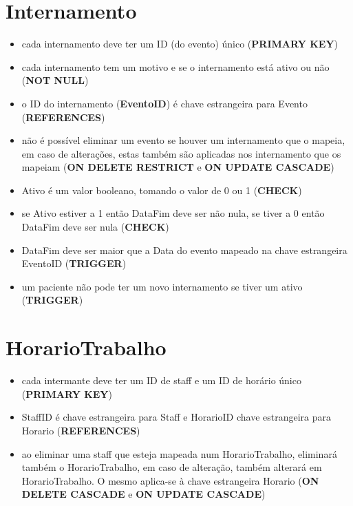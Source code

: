\documentclass[article, a4paper, 12pt, oneside]{memoir}
\begin{document}
\section*{Internamento}
\begin{itemize}
	\item cada internamento deve ter um ID (do evento) único (\textbf{PRIMARY KEY})
	\item cada internamento tem um motivo e se o internamento está ativo ou não (\textbf{NOT NULL})
	\item o ID do internamento (\textbf{EventoID}) é chave estrangeira para Evento (\textbf{REFERENCES})
	\item não é possível eliminar um evento se houver um internamento que o mapeia, em caso de alterações, estas também são aplicadas nos internamento que os mapeiam (\textbf{ON DELETE RESTRICT} e \textbf{ON UPDATE CASCADE})
	\item Ativo é um valor booleano, tomando o valor de 0 ou 1 (\textbf{CHECK})
	\item se Ativo estiver a 1 então DataFim deve ser não nula, se tiver a 0 então DataFim deve ser nula (\textbf{CHECK})
	\item DataFim deve ser maior que a Data do evento mapeado na chave estrangeira EventoID (\textbf{TRIGGER})
	\item um paciente não pode ter um novo internamento se tiver um ativo (\textbf{TRIGGER})
\end{itemize}

\section*{HorarioTrabalho}
\begin{itemize}
	\item cada intermante deve ter um ID de staff e um ID de horário único (\textbf{PRIMARY KEY})
	\item StaffID é chave estrangeira para Staff e HorarioID chave estrangeira para Horario (\textbf{REFERENCES})
	\item ao eliminar uma staff que esteja mapeada num HorarioTrabalho, eliminará também o HorarioTrabalho, em caso de alteração, também alterará em HorarioTrabalho. O mesmo aplica-se à chave estrangeira Horario (\textbf{ON DELETE CASCADE} e \textbf{ON UPDATE CASCADE})
\end{itemize}
\end{document}
